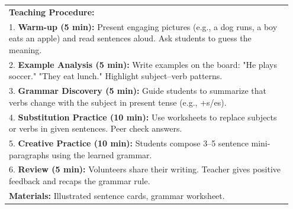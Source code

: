 \documentclass[11pt]{article}
\begin{document}
\begin{table}[htbp]
{\begin{tabular}{p{0.95\linewidth}}
\textbf{Teaching Procedure:} \\
1. \textbf{Warm-up (5 min):} Present engaging pictures (e.g., a dog runs, a boy eats an apple) and read sentences aloud. Ask students to guess the meaning. \\
2. \textbf{Example Analysis (5 min):} Write examples on the board: "He plays soccer." "They eat lunch." Highlight subject–verb patterns. \\
3. \textbf{Grammar Discovery (5 min):} Guide students to summarize that verbs change with the subject in present tense (e.g., +s/es). \\
4. \textbf{Substitution Practice (10 min):} Use worksheets to replace subjects or verbs in given sentences. Peer check answers. \\
5. \textbf{Creative Practice (10 min):} Students compose 3–5 sentence mini-paragraphs using the learned grammar. \\
6. \textbf{Review (5 min):} Volunteers share their writing. Teacher gives positive feedback and recaps the grammar rule. \\
\textbf{Materials:} Illustrated sentence cards, grammar worksheet. \\
\bottomrule
\end{tabular}
}
\end{table}
\end{document}
